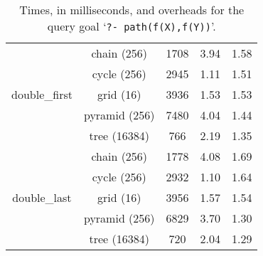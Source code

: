 \begin{table}[ht]
{\begin{tabular}{cc|ccc}
   \multirow{5}{*}{double\_first} &  \footnotesize{chain (256)} & 1708 &  3.94  &  1.58 \\
   &  \footnotesize{cycle (256)} & 2945 &  1.11  &  1.51 \\
   &  \footnotesize{grid (16)} & 3936 &  1.53  &  1.53 \\
   &  \footnotesize{pyramid (256)} & 7480 &  4.04  &  1.44 \\
   &  \footnotesize{tree (16384)} & 766 &  2.19  &  1.35 \\
   \hline
   \multirow{5}{*}{double\_last} &  \footnotesize{chain (256)} & 1778 &  4.08  &  1.69 \\
   &  \footnotesize{cycle (256)} & 2932 &  1.10  &  1.64 \\
   &  \footnotesize{grid (16)} & 3956 &  1.57  &  1.54 \\
   &  \footnotesize{pyramid (256)} & 6829 &  3.70  &  1.30 \\
   &  \footnotesize{tree (16384)} & 720 &  2.04  &  1.29 \\
   \hline
\hline
\end{tabular}
}
\caption{Times, in milliseconds, and overheads for the query goal `\texttt{?-~path(f(X),f(Y))}'.}
\label{tbl:results_detail_stst}
\end{table}